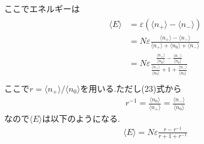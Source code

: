 ここでエネルギーは
\begin{align}
  \begin{split}
    \langle E\rangle&=\varepsilon(\langle n_+\rangle-\langle n_-\rangle)\\
    &=N\varepsilon\frac{\langle n_+\rangle-\langle n_-\rangle}{\langle n_+\rangle+\langle n_0\rangle+\langle n_-\rangle}\\
    &=N\varepsilon\frac{\frac{\langle n_+\rangle}{\langle n_0\rangle}-\frac{\langle n_-\rangle}{\langle n_0\rangle}}{\frac{\langle n_+\rangle}{\langle n_0\rangle}+1+\frac{\langle n_-\rangle}{\langle n_0\rangle}}\\
  \end{split}
\end{align}
ここで$r=\langle n_+\rangle/\langle n_0\rangle$を用いる.ただし(23)式から
\begin{align}
    r^{-1}=\frac{\langle n_0\rangle}{\langle n_+\rangle}=\frac{\langle n_-\rangle}{\langle n_0\rangle}
\end{align}
なので$\langle E\rangle$は以下のようになる.
\begin{align}
  \langle E\rangle=N\varepsilon\frac{r-r^{-1}}{r+1+r^{-1}}
\end{align}

